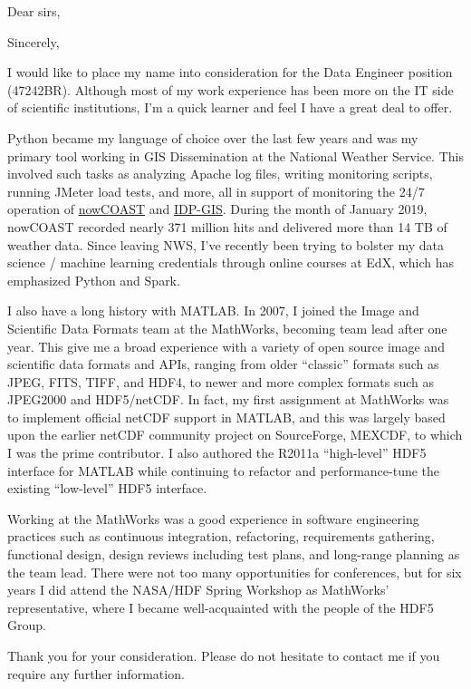 \documentclass[11pt]{moderncv}  %
\begin{document}
\opening{Dear sirs,}
\closing{Sincerely,}


\makelettertitle

I would like to place my name into consideration for the Data
Engineer position (47242BR).  Although most of my work experience
has been more on the IT side of scientific institutions, I'm a quick
learner and feel I have a great deal to offer.

Python became my language of choice over the last few years and was
my primary tool working in GIS Dissemination at the National Weather
Service.  This involved such tasks as analyzing Apache log files,
writing monitoring scripts, running JMeter load tests, and more, all in
support of monitoring the 24/7 operation of \href{https://nowcoast.noaa.gov}{nowCOAST}
and \href{https://idpgis.ncep.noaa.gov}{IDP-GIS}.  During the month of January 2019, nowCOAST
recorded nearly 371 million hits and delivered more than 14 TB of weather data.
Since leaving NWS, I've recently been trying to bolster my data science / machine learning
credentials through online courses at EdX, which has emphasized Python and Spark.

I also have a long history with MATLAB.  In 2007, I joined the Image
and Scientific Data Formats team at the MathWorks, becoming  team
lead after one year.  This give me a broad experience with a variety
of open source image and scientific data formats and APIs, ranging
from older “classic” formats such as JPEG, FITS, TIFF, and HDF4,
to newer and more complex formats such as JPEG2000 and HDF5/netCDF.
In fact, my first assignment at MathWorks was to implement official
netCDF support in MATLAB, and this was largely based upon the earlier
netCDF community project on SourceForge, MEXCDF, to which I was the
prime contributor.   I also authored the R2011a “high-level” HDF5
interface for MATLAB while continuing to refactor and performance-tune
the existing “low-level” HDF5 interface.

Working at the MathWorks was a good experience in software engineering
practices such as continuous integration, refactoring, requirements
gathering, functional design, design reviews including test plans,
and long-range planning as the team lead.   There were not too many
opportunities for conferences, but for six years I did attend the
NASA/HDF Spring Workshop as MathWorks’ representative, where I
became well-acquainted with the people of the HDF5 Group.

Thank you for your consideration.  Please do not hesitate to contact
me if you require any further information.

\makeletterclosing
\end{document}
